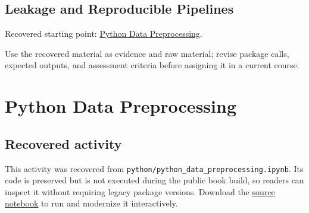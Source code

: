 \documentclass[
  letterpaper,
]{scrbook}
\begin{document}
\section*{Leakage and Reproducible
Pipelines}\label{sec-pr-06-leakage-and-reproducible-pipelines}


Recovered starting point: \hyperref[sec-lab-data-preprocessing]{Python
Data Preprocessing}.

Use the recovered material as evidence and raw material; revise package
calls, expected outputs, and assessment criteria before assigning it in
a current course.

\chapter*{Python Data Preprocessing}\label{ch-lab-data-preprocessing}


\section*{Recovered activity}\label{sec-lab-data-preprocessing}


\begin{tcolorbox}[enhanced jigsaw, arc=.35mm, bottomrule=.15mm, bottomtitle=1mm, breakable, colback=white, colbacktitle=quarto-callout-note-color!10!white, colframe=quarto-callout-note-color-frame, coltitle=black, left=2mm, leftrule=.75mm, opacityback=0, opacitybacktitle=0.6, rightrule=.15mm, title=\textcolor{quarto-callout-note-color}{\faInfo}\hspace{0.5em}{Historical source and execution note}, titlerule=0mm, toprule=.15mm, toptitle=1mm]

This activity was recovered from
\texttt{python/python\_data\_preprocessing.ipynb}. Its code is preserved
but is not executed during the public book build, so readers can inspect
it without requiring legacy package versions. Download the
\href{../notebooks/data-preprocessing.ipynb}{source notebook} to run and
modernize it interactively.

\end{tcolorbox}
\end{document}
